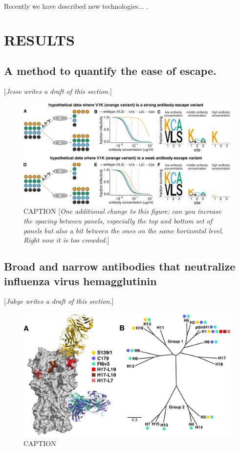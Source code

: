\documentclass[11pt]{article}
\newcommand{\comment}[1]{{\color{red}[\textsl{#1}]}}
\begin{document}
Recently we have described new technologies... \cite{doud2017complete, dingens2017comprehensive}.


\section*{RESULTS}

\subsection*{A method to quantify the ease of escape.}
\comment{Jesse writes a draft of this section.}
\begin{figure}
\centerline{\includegraphics[width=\textwidth]{figs/fracsurvive_example/fracsurvive_fig.pdf}}
\caption{\label{fig:fracsurvive_example}
CAPTION
\comment{One additional change to this figure: can you increase the spacing between panels, especially the top and bottom set of panels but also a bit between the ones on the same horizontal level. Right now it is too crowded.}
}
\end{figure}

\subsection*{Broad and narrow antibodies that neutralize influenza virus hemagglutinin}
\comment{Juhye writes a draft of this section.}
\begin{figure}
\centerline{\includegraphics[width=\textwidth]{figs/antibody_summary_fig/Ab_summary.pdf}}
\caption{\label{fig:antibody_summary}
CAPTION
}
\end{figure}
\end{document}
